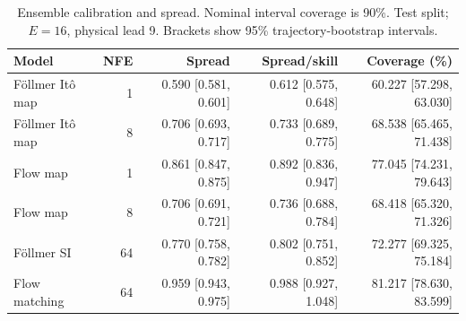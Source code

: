 \begin{table}[t]
\centering
\small
\setlength{\tabcolsep}{3pt}
\caption{Ensemble calibration and spread. Nominal interval coverage is 90\%. Test split; $E=16$, physical lead 9. Brackets show 95\% trajectory-bootstrap intervals.}
\label{tab:map-calibration}
\begin{tabular}{lrrrr}
\toprule
Model & NFE & Spread & Spread/skill & Coverage (\%) \\
\midrule
Föllmer Itô map & 1 & 0.590 [0.581, 0.601] & 0.612 [0.575, 0.648] & 60.227 [57.298, 63.030] \\
Föllmer Itô map & 8 & 0.706 [0.693, 0.717] & 0.733 [0.689, 0.775] & 68.538 [65.465, 71.438] \\
\addlinespace
Flow map & 1 & 0.861 [0.847, 0.875] & 0.892 [0.836, 0.947] & 77.045 [74.231, 79.643] \\
Flow map & 8 & 0.706 [0.691, 0.721] & 0.736 [0.688, 0.784] & 68.418 [65.320, 71.326] \\
\addlinespace
Föllmer SI & 64 & 0.770 [0.758, 0.782] & 0.802 [0.751, 0.852] & 72.277 [69.325, 75.184] \\
\addlinespace
Flow matching & 64 & 0.959 [0.943, 0.975] & 0.988 [0.927, 1.048] & 81.217 [78.630, 83.599] \\
\bottomrule
\end{tabular}
\end{table}
